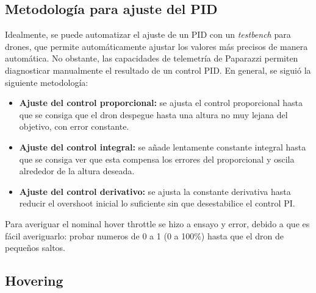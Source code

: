 
\subsection{Metodología para ajuste del PID}

Idealmente, se puede automatizar el ajuste de un PID con un \textit{testbench} para drones,
que permite automáticamente ajustar los valores más precisos de manera automática. 
No obstante, las capacidades de telemetría de Paparazzi permiten diagnosticar manualmente el 
resultado de un control PID. En general, se siguió la siguiente metodología:

\begin{itemize}
    \item \textbf{Ajuste del control proporcional:} se ajusta el control proporcional hasta que se consiga que el dron despegue hasta una altura no muy lejana del objetivo, con error constante.
    \item \textbf{Ajuste del control integral:} se añade lentamente constante integral hasta que se consiga ver que esta compensa los errores del proporcional y oscila alrededor de la altura deseada.
    \item \textbf{Ajuste del control derivativo:} se ajusta la constante derivativa hasta reducir el overshoot inicial lo suficiente sin que desestabilice el control PI.
\end{itemize}

Para averiguar el nominal hover throttle se hizo a ensayo y error, debido a que es fácil averiguarlo: probar numeros de 0 a 1 (0 a 100\%) hasta que el dron de pequeños saltos.


\subsection{Hovering}

